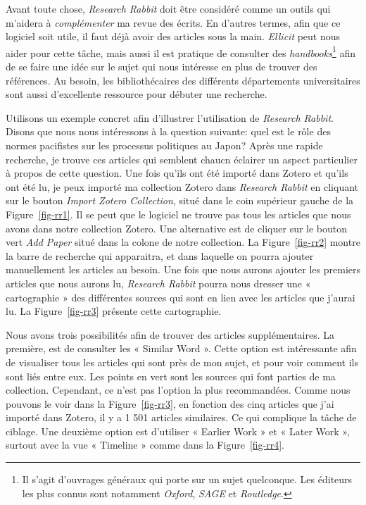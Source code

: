 \documentclass[
  letterpaper,
]{scrbook}
\begin{document}
Avant toute chose, \emph{Research Rabbit} doit être considéré comme un
outils qui m'aidera à \emph{complémenter} ma revue des écrits. En
d'autres termes, afin que ce logiciel soit utile, il faut déjà avoir des
articles sous la main. \emph{Ellicit} peut nous aider pour cette tâche,
mais aussi il est pratique de consulter des \emph{handbooks}\footnote{Il
  s'agit d'ouvrages généraux qui porte sur un sujet quelconque. Les
  éditeurs les plus connus sont notamment \emph{Oxford}, \emph{SAGE} et
  \emph{Routledge}.} afin de se faire une idée sur le sujet qui nous
intéresse en plus de trouver des références. Au besoin, les
bibliothécaires des différents départements universitaires sont aussi
d'excellente ressource pour débuter une recherche.

Utilisons un exemple concret afin d'illustrer l'utilisation de
\emph{Research Rabbit}. Disons que nous nous intéressons à la question
suivante: quel est le rôle des normes pacifistes sur les processus
politiques au Japon? Après une rapide recherche, je trouve ces articles
qui semblent chaucn éclairer un aspect particulier à propos de cette
question. Une fois qu'ils ont été importé dans Zotero et qu'ils ont été
lu, je peux importé ma collection Zotero dans \emph{Research Rabbit} en
cliquant sur le bouton \emph{Import Zotero Collection}, situé dans le
coin supérieur gauche de la Figure~\ref{fig-rr1}. Il se peut que le
logiciel ne trouve pas tous les articles que nous avons dans notre
collection Zotero. Une alternative est de cliquer sur le bouton vert
\emph{Add Paper} situé dans la colone de notre collection. La
Figure~\ref{fig-rr2} montre la barre de recherche qui apparaitra, et
dans laquelle on pourra ajouter manuellement les articles au besoin. Une
fois que nous aurons ajouter les premiers articles que nous aurons lu,
\emph{Research Rabbit} pourra nous dresser une « cartographie » des
différentes sources qui sont en lien avec les articles que j'aurai lu.
La Figure~\ref{fig-rr3} présente cette cartographie.

Nous avons trois possibilités afin de trouver des articles
supplémentaires. La première, est de consulter les « Similar Word ».
Cette option est intéressante afin de visualiser tous les articles qui
sont près de mon sujet, et pour voir comment ils sont liés entre eux.
Les points en vert sont les sources qui font parties de ma collection.
Cependant, ce n'est pas l'option la plus recommandées. Comme nous
pouvons le voir dans la Figure~\ref{fig-rr3}, en fonction des cinq
articles que j'ai importé dans Zotero, il y a 1 501 articles similaires.
Ce qui complique la tâche de ciblage. Une deuxième option est d'utiliser
« Earlier Work » et « Later Work », surtout avec la vue « Timeline »
comme dans la Figure~\ref{fig-rr4}.
\end{document}
